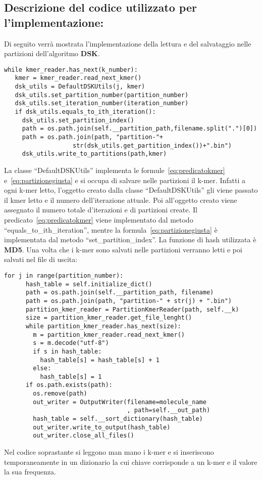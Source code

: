 \subsection{Descrizione del codice utilizzato per l'implementazione:}
Di seguito verr\`a mostrata l'implementazione della lettura e del salvataggio nelle partizioni dell'algoritmo \textbf{DSK}.
\begin{lstlisting}[label={lst:parte1}]
 while kmer_reader.has_next(k_number):
   kmer = kmer_reader.read_next_kmer()
   dsk_utils = DefaultDSKUtils(j, kmer)
   dsk_utils.set_partition_number(partition_number)
   dsk_utils.set_iteration_number(iteration_number)
   if dsk_utils.equals_to_ith_iteration():
     dsk_utils.set_partition_index()
     path = os.path.join(self.__partition_path,filename.split(".")[0])
     path = os.path.join(path, "partition-"+
                   str(dsk_utils.get_partition_index())+".bin")
     dsk_utils.write_to_partitions(path,kmer)
\end{lstlisting}
La classe ``DefaultDSKUtils'' implementa le formule~\eqref{eq:predicatokmer} e~\eqref{eq:partizionegiusta} e si occupa di salvare nelle partizioni il k-mer.
Infatti a ogni k-mer letto, l'oggetto creato dalla classe ``DefaultDSKUtils'' gli viene passato il kmer letto e il numero dell'iterazione attuale.
Poi all'oggetto creato viene assegnato il numero totale d'iterazioni e di partizioni create.
Il predicato~\eqref{eq:predicatokmer} viene implementato dal metodo ``equals\_to\_ith\_iteration'', mentre la formula~\eqref{eq:partizionegiusta} \`e implementata dal metodo ``set\_partition\_index''.
La funzione di hash utilizzata \`e \textbf{MD5}.
Una volta che i k-mer sono salvati nelle partizioni verranno letti e poi salvati nel file di uscita:
\begin{lstlisting}[label={lst:codedsk2ndpart}]
    for j in range(partition_number):
      hash_table = self.initialize_dict()
      path = os.path.join(self.__partition_path, filename)
      path = os.path.join(path, "partition-" + str(j) + ".bin")
      partition_kmer_reader = PartitionKmerReader(path, self.__k)
      size = partition_kmer_reader.get_file_lenght()
      while partition_kmer_reader.has_next(size):
        m = partition_kmer_reader.read_next_kmer()
        s = m.decode("utf-8")
        if s in hash_table:
          hash_table[s] = hash_table[s] + 1
        else:
          hash_table[s] = 1
      if os.path.exists(path):
        os.remove(path)
        out_writer = OutputWriter(filename=molecule_name
                                  , path=self.__out_path)
        hash_table = self.__sort_dictionary(hash_table)
        out_writer.write_to_output(hash_table)
        out_writer.close_all_files()
\end{lstlisting}
Nel codice soprastante si leggono man mano i k-mer e si inseriscono temporaneamente in un dizionario la cui chiave corrisponde a un k-mer e il valore la sua frequenza.

